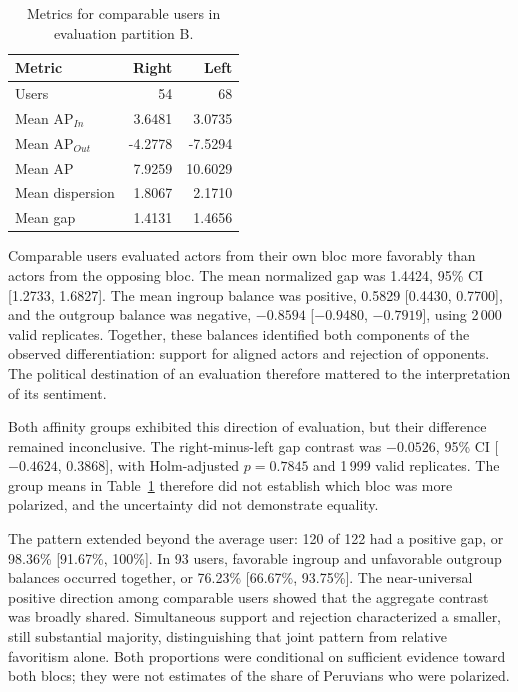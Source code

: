 \documentclass[conference,letterpaper]{IEEEtran}
\begin{document}
\begin{table}[t]
\centering\small
\caption{Metrics for comparable users in evaluation partition B.}
\label{tab:ap_spread}
\begin{tabular}{lrr}\toprule
Metric & Right & Left\\\midrule
Users & 54 & 68\\
Mean AP$_{In}$ & 3.6481 & 3.0735\\
Mean AP$_{Out}$ & -4.2778 & -7.5294\\
Mean AP & 7.9259 & 10.6029\\
Mean dispersion & 1.8067 & 2.1710\\
Mean gap & 1.4131 & 1.4656\\
\bottomrule\end{tabular}
\end{table}

Comparable users evaluated actors from their own bloc more favorably than actors from the opposing bloc. The mean normalized gap was 1.4424, 95\% CI [1.2733, 1.6827]. The mean ingroup balance was positive, 0.5829 [0.4430, 0.7700], and the outgroup balance was negative, $-0.8594$ [$-0.9480$, $-0.7919$], using 2\,000 valid replicates. Together, these balances identified both components of the observed differentiation: support for aligned actors and rejection of opponents. The political destination of an evaluation therefore mattered to the interpretation of its sentiment.

Both affinity groups exhibited this direction of evaluation, but their difference remained inconclusive. The right-minus-left gap contrast was $-0.0526$, 95\% CI [$-0.4624$, 0.3868], with Holm-adjusted $p=0.7845$ and 1\,999 valid replicates. The group means in Table~\ref{tab:ap_spread} therefore did not establish which bloc was more polarized, and the uncertainty did not demonstrate equality.

The pattern extended beyond the average user: 120 of 122 had a positive gap, or 98.36\% [91.67\%, 100\%]. In 93 users, favorable ingroup and unfavorable outgroup balances occurred together, or 76.23\% [66.67\%, 93.75\%]. The near-universal positive direction among comparable users showed that the aggregate contrast was broadly shared. Simultaneous support and rejection characterized a smaller, still substantial majority, distinguishing that joint pattern from relative favoritism alone. Both proportions were conditional on sufficient evidence toward both blocs; they were not estimates of the share of Peruvians who were polarized.
\end{document}

